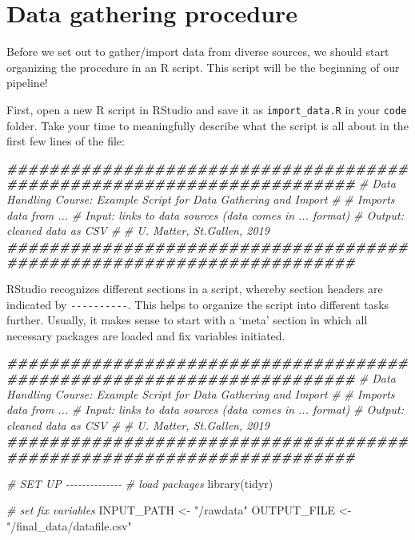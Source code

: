 \documentclass[
  12pt,
]{style/krantz}
\newenvironment{Shaded}{\begin{snugshade}}{\end{snugshade}}
\newcommand{\CommentTok}[1]{\textcolor[rgb]{0.56,0.35,0.01}{\textit{#1}}}
\newcommand{\DocumentationTok}[1]{\textcolor[rgb]{0.56,0.35,0.01}{\textbf{\textit{#1}}}}
\newcommand{\FunctionTok}[1]{\textcolor[rgb]{0.00,0.00,0.00}{#1}}
\newcommand{\NormalTok}[1]{#1}
\newcommand{\OtherTok}[1]{\textcolor[rgb]{0.56,0.35,0.01}{#1}}
\newcommand{\StringTok}[1]{\textcolor[rgb]{0.31,0.60,0.02}{#1}}
\begin{document}
\hypertarget{data-gathering-procedure}{%
\section{Data gathering procedure}\label{data-gathering-procedure}}

Before we set out to gather/import data from diverse sources, we should start organizing the procedure in an R script. This script will be the beginning of our pipeline!

First, open a new R script in RStudio and save it as \texttt{import\_data.R} in your \texttt{code} folder. Take your time to meaningfully describe what the script is all about in the first few lines of the file:

\begin{Shaded}
\begin{Highlighting}[]
\DocumentationTok{\#\#\#\#\#\#\#\#\#\#\#\#\#\#\#\#\#\#\#\#\#\#\#\#\#\#\#\#\#\#\#\#\#\#\#\#\#\#\#\#\#\#\#\#\#\#\#\#\#\#\#\#\#\#\#\#\#\#\#\#\#\#\#\#\#\#\#\#\#\#\#}
\CommentTok{\# Data Handling Course: Example Script for Data Gathering and Import}
\CommentTok{\#}
\CommentTok{\# Imports data from ...}
\CommentTok{\# Input: links to data sources (data comes in ... format)}
\CommentTok{\# Output: cleaned data as CSV}
\CommentTok{\#}
\CommentTok{\# U. Matter, St.Gallen, 2019}
\DocumentationTok{\#\#\#\#\#\#\#\#\#\#\#\#\#\#\#\#\#\#\#\#\#\#\#\#\#\#\#\#\#\#\#\#\#\#\#\#\#\#\#\#\#\#\#\#\#\#\#\#\#\#\#\#\#\#\#\#\#\#\#\#\#\#\#\#\#\#\#\#\#\#\#}
\end{Highlighting}
\end{Shaded}

RStudio recognizes different sections in a script, whereby section headers are indicated by \texttt{-\/-\/-\/-\/-\/-\/-\/-\/-\/-}. This helps to organize the script into different tasks further. Usually, it makes sense to start with a `meta' section in which all necessary packages are loaded and fix variables initiated.

\begin{Shaded}
\begin{Highlighting}[]
\DocumentationTok{\#\#\#\#\#\#\#\#\#\#\#\#\#\#\#\#\#\#\#\#\#\#\#\#\#\#\#\#\#\#\#\#\#\#\#\#\#\#\#\#\#\#\#\#\#\#\#\#\#\#\#\#\#\#\#\#\#\#\#\#\#\#\#\#\#\#\#\#\#\#\#}
\CommentTok{\# Data Handling Course: Example Script for Data Gathering and Import}
\CommentTok{\#}
\CommentTok{\# Imports data from ...}
\CommentTok{\# Input: links to data sources (data comes in ... format)}
\CommentTok{\# Output: cleaned data as CSV}
\CommentTok{\#}
\CommentTok{\# U. Matter, St.Gallen, 2019}
\DocumentationTok{\#\#\#\#\#\#\#\#\#\#\#\#\#\#\#\#\#\#\#\#\#\#\#\#\#\#\#\#\#\#\#\#\#\#\#\#\#\#\#\#\#\#\#\#\#\#\#\#\#\#\#\#\#\#\#\#\#\#\#\#\#\#\#\#\#\#\#\#\#\#\#}


\CommentTok{\# SET UP {-}{-}{-}{-}{-}{-}{-}{-}{-}{-}{-}{-}{-}{-}}
\CommentTok{\# load packages}
\FunctionTok{library}\NormalTok{(tidyr)}

\CommentTok{\# set fix variables}
\NormalTok{INPUT\_PATH }\OtherTok{\textless{}{-}} \StringTok{"/rawdata"}
\NormalTok{OUTPUT\_FILE }\OtherTok{\textless{}{-}} \StringTok{"/final\_data/datafile.csv"}
\end{Highlighting}
\end{Shaded}
\end{document}
